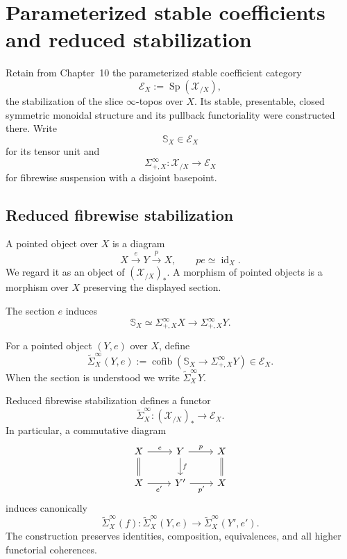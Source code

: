 \section{Parameterized stable coefficients and reduced stabilization}
\label{sec:bnla-stable-ambient}

Retain from Chapter~10 the parameterized stable coefficient category
\[
    \mathcal E_X
    :=
    \operatorname{Sp}(\mathcal X_{/X}),
\]
the stabilization of the slice $\infty$-topos over $X$.  Its stable,
presentable, closed symmetric monoidal structure and its pullback
functoriality were constructed there.  Write
\[
    \mathbb S_X\in\mathcal E_X
\]
for its tensor unit and
\[
    \Sigma^\infty_{+,X}:
    \mathcal X_{/X}
    \longrightarrow
    \mathcal E_X
\]
for fibrewise suspension with a disjoint basepoint.

\subsection{Reduced fibrewise stabilization}

\begin{definition}
\label{def:bnla-pointed-object}
A pointed object over $X$ is a diagram
\[
    X\xrightarrow{e}Y\xrightarrow{p}X,
    \qquad
    pe\simeq\operatorname{id}_X.
\]
We regard it as an object of $(\mathcal X_{/X})_*$.  A morphism of pointed
objects is a morphism over $X$ preserving the displayed section.
\end{definition}

The section $e$ induces
\[
    \mathbb S_X
    \simeq
    \Sigma^\infty_{+,X}X
    \longrightarrow
    \Sigma^\infty_{+,X}Y.
\]

\begin{definition}
\label{def:bnla-reduced-stabilization}
For a pointed object $(Y,e)$ over $X$, define
\[
    \widetilde\Sigma^\infty_X(Y,e)
    :=
    \operatorname{cofib}
    \left(
        \mathbb S_X
        \longrightarrow
        \Sigma^\infty_{+,X}Y
    \right)
    \in\mathcal E_X.
\]
When the section is understood we write
$\widetilde\Sigma^\infty_XY$.
\end{definition}

\begin{proposition}
\label{prop:bnla-reduced-stabilization-functoriality}
Reduced fibrewise stabilization defines a functor
\[
    \widetilde\Sigma^\infty_X:
    (\mathcal X_{/X})_*
    \longrightarrow
    \mathcal E_X.
\]
In particular, a commutative diagram
\[
\begin{tikzcd}
X \arrow[r,"e"] \arrow[d,equal] &
Y \arrow[r,"p"] \arrow[d,"f"] &
X \arrow[d,equal]\\
X \arrow[r,"e'"'] &
Y' \arrow[r,"p'"'] &
X
\end{tikzcd}
\]
induces canonically
\[
    \widetilde\Sigma^\infty_X(f):
    \widetilde\Sigma^\infty_X(Y,e)
    \longrightarrow
    \widetilde\Sigma^\infty_X(Y',e').
\]
The construction preserves identities, composition, equivalences, and all
higher functorial coherences.
\end{proposition}

